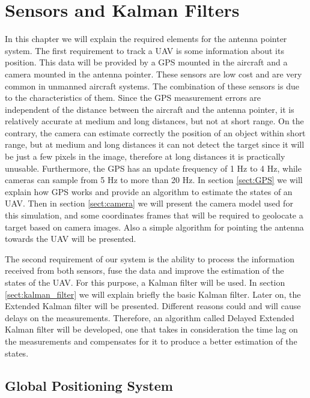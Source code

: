 \chapter{Sensors and Kalman Filters}{\label{ch:Sensors}}
In this chapter we will explain the required elements for the antenna pointer system. The first requirement to track a UAV is some information about its position. This data will be provided by a GPS mounted in the aircraft and a camera mounted in the antenna pointer. These sensors are low cost and are very common in unmanned aircraft systems. The combination of these sensors is due to the characteristics of them. Since the GPS measurement errors are independent of the distance between the aircraft and the antenna pointer, it is relatively accurate at medium and long distances, but not at short range. On the contrary, the camera can estimate correctly the position of an object within short range, but at medium and long distances it can not detect the target since it will be just a few pixels in the image, therefore at long distances it is practically unusable. Furthermore, the GPS has an update frequency of 1 Hz to 4 Hz, while cameras can sample from 5 Hz to more than 20 Hz. In section \ref{sect:GPS} we will explain how GPS works and provide an algorithm to estimate the states of an UAV. Then in section \ref{sect:camera} we will present the camera model used for this simulation, and some coordinates frames that will be required to geolocate a target based on camera images. Also a simple algorithm for pointing the antenna towards the UAV will be presented.

The second requirement of our system is the ability to process the information received from both sensors, fuse the data and improve the estimation of the states of the UAV. For this purpose, a Kalman filter will be used. In section \ref{sect:kalman_filter} we will explain briefly the basic Kalman filter. Later on, the Extended Kalman filter will be presented. Different reasons could and will cause delays on the measurements. Therefore, an algorithm called Delayed Extended Kalman filter will be developed, one that takes in consideration the time lag on the measurements and compensates for it to produce a better estimation of the states.

\pagebreak

\section{Global Positioning System}{\label{sect:GPS}}

